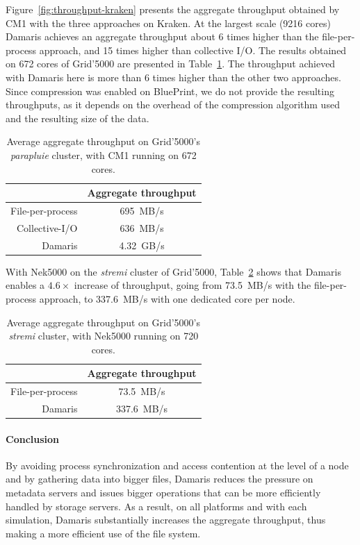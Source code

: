 Figure~\ref{fig:throughput-kraken} presents the aggregate throughput obtained by CM1
with the three approaches on Kraken.
At the largest scale (9216 cores) Damaris achieves an aggregate throughput about 6 times
higher than the file-per-process approach, and 15 times higher than collective I/O.
The results obtained on 672 cores of Grid'5000 are presented in 
Table~\ref{tab:grid5000_throughput}.
The throughput achieved with Damaris here is more than 6 times higher than the other two approaches.
Since compression was enabled on BluePrint, we do not provide the resulting 
throughputs, as it depends on the overhead of the compression algorithm used
and the resulting size of the data.

\begin{table}
\begin{tabular}{|r|c|}
  \hline
   & Aggregate throughput \\
   \hline
    File-per-process & 695~MB/s \\
    Collective-I/O & 636~MB/s \\
    Damaris & 4.32~GB/s \\
  \hline
\end{tabular}
\caption[Average aggregate throughput of CM1 on Grid'5000]{Average 
aggregate throughput on Grid'5000's \emph{parapluie} cluster, with CM1 running on 672 cores.}\label{tab:grid5000_throughput}
\end{table}

With Nek5000 on the \emph{stremi} cluster of Grid'5000, 
Table~\ref{tab:nek5_throughput} shows that Damaris enables a $4.6 \times$ increase
of throughput, going from 73.5~MB/s with the file-per-process approach, to 337.6~MB/s with one dedicated
core per node. 

\begin{table}
\begin{tabular}{|r|c|}
  \hline
   & Aggregate throughput \\
   \hline
    File-per-process & 73.5~MB/s \\
    Damaris & 337.6~MB/s \\
  \hline
\end{tabular}
\caption{Average aggregate throughput on Grid'5000's \emph{stremi} cluster, with Nek5000 running on 720 cores.}\label{tab:nek5_throughput}
\end{table}

\paragraph{Conclusion} By avoiding process synchronization and 
access contention at the level of a node and by gathering data into bigger 
files, Damaris reduces the pressure on metadata servers and issues bigger operations
that can be more efficiently handled by storage servers. As a result, on 
all platforms and with each simulation, Damaris substantially increases the aggregate 
throughput, thus making a more efficient use of the file system.


